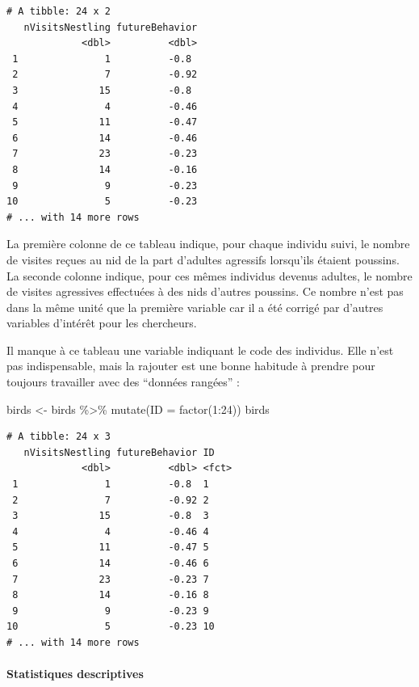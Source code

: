 \documentclass[
  a4paper,
]{article}
\newenvironment{Shaded}{\begin{snugshade}}{\end{snugshade}}
\newcommand{\AttributeTok}[1]{\textcolor[rgb]{0.00,0.34,0.68}{#1}}
\newcommand{\DecValTok}[1]{\textcolor[rgb]{0.69,0.50,0.00}{#1}}
\newcommand{\FunctionTok}[1]{\textcolor[rgb]{0.39,0.29,0.61}{#1}}
\newcommand{\NormalTok}[1]{\textcolor[rgb]{0.12,0.11,0.11}{#1}}
\newcommand{\OtherTok}[1]{\textcolor[rgb]{0.00,0.43,0.16}{#1}}
\newcommand{\SpecialCharTok}[1]{\textcolor[rgb]{0.24,0.68,0.91}{#1}}
\begin{document}
\begin{verbatim}
# A tibble: 24 x 2
   nVisitsNestling futureBehavior
             <dbl>          <dbl>
 1               1          -0.8 
 2               7          -0.92
 3              15          -0.8 
 4               4          -0.46
 5              11          -0.47
 6              14          -0.46
 7              23          -0.23
 8              14          -0.16
 9               9          -0.23
10               5          -0.23
# ... with 14 more rows
\end{verbatim}

La première colonne de ce tableau indique, pour chaque individu suivi, le nombre de visites reçues au nid de la part d'adultes agressifs lorsqu'ils étaient poussins. La seconde colonne indique, pour ces mêmes individus devenus adultes, le nombre de visites agressives effectuées à des nids d'autres poussins. Ce nombre n'est pas dans la même unité que la première variable car il a été corrigé par d'autres variables d'intérêt pour les chercheurs.

Il manque à ce tableau une variable indiquant le code des individus. Elle n'est pas indispensable, mais la rajouter est une bonne habitude à prendre pour toujours travailler avec des ``données rangées'' :

\begin{Shaded}
\begin{Highlighting}[]
\NormalTok{birds }\OtherTok{\textless{}{-}}\NormalTok{ birds }\SpecialCharTok{\%\textgreater{}\%} 
  \FunctionTok{mutate}\NormalTok{(}\AttributeTok{ID =} \FunctionTok{factor}\NormalTok{(}\DecValTok{1}\SpecialCharTok{:}\DecValTok{24}\NormalTok{))}
\NormalTok{birds}
\end{Highlighting}
\end{Shaded}

\begin{verbatim}
# A tibble: 24 x 3
   nVisitsNestling futureBehavior ID   
             <dbl>          <dbl> <fct>
 1               1          -0.8  1    
 2               7          -0.92 2    
 3              15          -0.8  3    
 4               4          -0.46 4    
 5              11          -0.47 5    
 6              14          -0.46 6    
 7              23          -0.23 7    
 8              14          -0.16 8    
 9               9          -0.23 9    
10               5          -0.23 10   
# ... with 14 more rows
\end{verbatim}

\hypertarget{statistiques-descriptives-4}{%
\paragraph{Statistiques descriptives}\label{statistiques-descriptives-4}}
\end{document}

